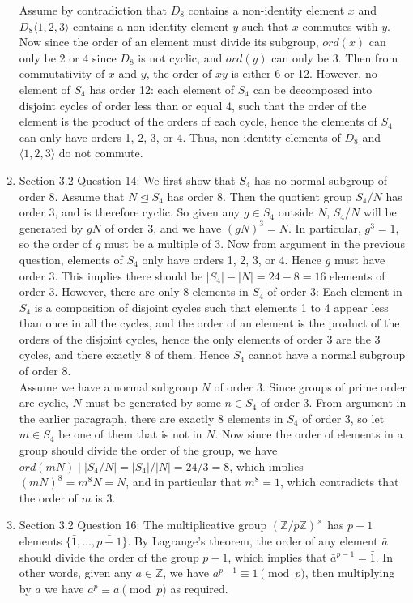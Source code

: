 \documentclass{article}
\begin{document}
\begin{enumerate}
    Assume by contradiction that $D_8$ contains a non-identity element $x$
    and $D_8\langle 1,2,3\rangle$ contains a non-identity element $y$ such
    that $x$ commutes with $y$. Now since the order of an element must
    divide its subgroup, $ord(x)$ can only be 2 or 4 since $D_8$ is not
    cyclic, and $ord(y)$ can only be 3. Then from commutativity of $x$ and
    $y$, the order of $xy$ is either 6 or 12. However, no element of $S_4$
    has order 12: each element of $S_4$ can be decomposed into disjoint
    cycles of order less than or equal 4, such that the order of the
    element is the product of the orders of each cycle, hence the elements
    of $S_4$ can only have orders 1, 2, 3, or 4. Thus, non-identity
    elements of $D_8$ and $\langle 1,2,3\rangle$ do not commute.

  \item Section 3.2 Question 14: We first show that $S_4$ has no normal
    subgroup of order 8. Assume that $N\trianglelefteq S_4$ has order 8.
    Then the quotient group $S_4/N$ has order 3, and is therefore cyclic.
    So given any $g\in S_4$ outside $N$, $S_4/N$ will be generated by $gN$
    of order 3, and we have $(gN)^3=N$. In particular, $g^3=1$, so the
    order of $g$ must be a multiple of 3. Now from argument in the previous
    question, elements of $S_4$ only have orders 1, 2, 3, or 4. Hence $g$
    must have order 3. This implies there should be $|S_4|-|N|=24-8=16$
    elements of order 3. However, there are only 8 elements in $S_4$ of
    order 3: Each element in $S_4$ is a composition of disjoint cycles such
    that elements 1 to 4 appear less than once in all the cycles, and the
    order of an element is the product of the orders of the disjoint
    cycles, hence the only elements of order 3 are the 3 cycles, and there
    exactly 8 of them. Hence $S_4$ cannot have a normal subgroup of order
    8. \\

    Assume we have a normal subgroup $N$ of order 3. Since groups of prime
    order are cyclic, $N$ must be generated by some $n\in S_4$ of order 3.
    From argument in the earlier paragraph, there are exactly 8 elements in
    $S_4$ of order 3, so let $m\in S_4$ be one of them that is not in $N$.
    Now since the order of elements in a group should divide the order of
    the group, we have $ord(mN)\mid|S_4/N|=|S_4|/|N|=24/3=8$, which
    implies $(mN)^8=m^8N=N$, and in particular that $m^8=1$, which
    contradicts that the order of $m$ is 3.

  \item Section 3.2 Question 16: The multiplicative group
    $(\mathbb{Z}/p\mathbb{Z})^\times$ has $p-1$ elements
    $\{\bar{1},\ldots,\bar{p-1}\}$. By Lagrange's theorem, the order of any
    element $\bar{a}$ should divide the order of the group $p-1$, which
    implies that $\bar{a}^{p-1}=\bar{1}$. In other words, given any
    $a\in\mathbb{Z}$, we have $a^{p-1} \equiv 1\pmod{p}$, then multiplying
    by $a$ we have $a^p \equiv a\pmod{p}$ as required.


\end{enumerate}
\end{document}
